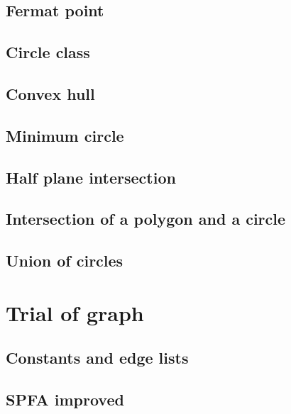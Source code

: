 \documentclass[UTF8,a4paper]{report}
\begin{document}
		\section{Fermat point}
			
		\section{Circle class}
			
		\section{Convex hull}
			
		\section{Minimum circle}
			
		\section{Half plane intersection}
			
		\section{Intersection of a polygon and a circle}
			
		\section{Union of circles}	
			
	\chapter{Trial of graph}
		\section{Constants and edge lists}
			
		\section{SPFA improved}
			
\end{document}
